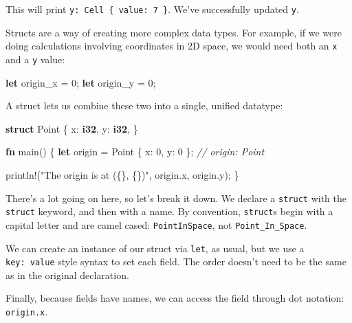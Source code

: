 \documentclass[a4paper,]{book}
\newenvironment{Shaded}{\begin{snugshade}}{\end{snugshade}}
\newcommand{\KeywordTok}[1]{\textcolor[rgb]{0.13,0.29,0.53}{\textbf{{#1}}}}
\newcommand{\DecValTok}[1]{\textcolor[rgb]{0.00,0.00,0.81}{{#1}}}
\newcommand{\StringTok}[1]{\textcolor[rgb]{0.31,0.60,0.02}{{#1}}}
\newcommand{\CommentTok}[1]{\textcolor[rgb]{0.56,0.35,0.01}{\textit{{#1}}}}
\newcommand{\OtherTok}[1]{\textcolor[rgb]{0.56,0.35,0.01}{{#1}}}
\newcommand{\NormalTok}[1]{{#1}}
\begin{document}
This will print \texttt{y:\ Cell\ \{\ value:\ 7\ \}}. We've successfully
updated \texttt{y}.


Structs are a way of creating more complex data types. For example, if
we were doing calculations involving coordinates in 2D space, we would
need both an \texttt{x} and a \texttt{y} value:

\begin{Shaded}
\begin{Highlighting}[]
\KeywordTok{let} \NormalTok{origin_x = }\DecValTok{0}\NormalTok{;}
\KeywordTok{let} \NormalTok{origin_y = }\DecValTok{0}\NormalTok{;}
\end{Highlighting}
\end{Shaded}

A struct lets us combine these two into a single, unified datatype:

\begin{Shaded}
\begin{Highlighting}[]
\KeywordTok{struct} \NormalTok{Point \{}
    \NormalTok{x: }\KeywordTok{i32}\NormalTok{,}
    \NormalTok{y: }\KeywordTok{i32}\NormalTok{,}
\NormalTok{\}}

\KeywordTok{fn} \NormalTok{main() \{}
    \KeywordTok{let} \NormalTok{origin = Point \{ x: }\DecValTok{0}\NormalTok{, y: }\DecValTok{0} \NormalTok{\}; }\CommentTok{// origin: Point}

    \OtherTok{println!}\NormalTok{(}\StringTok{"The origin is at (\{\}, \{\})"}\NormalTok{, origin.x, origin.y);}
\NormalTok{\}}
\end{Highlighting}
\end{Shaded}

There's a lot going on here, so let's break it down. We declare a
\texttt{struct} with the \texttt{struct} keyword, and then with a name.
By convention, \texttt{struct}s begin with a capital letter and are
camel cased: \texttt{PointInSpace}, not \texttt{Point\_In\_Space}.

We can create an instance of our struct via \texttt{let}, as usual, but
we use a \texttt{key:\ value} style syntax to set each field. The order
doesn't need to be the same as in the original declaration.

Finally, because fields have names, we can access the field through dot
notation: \texttt{origin.x}.
\end{document}
